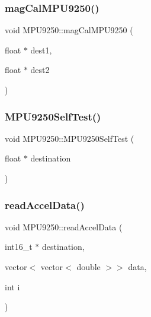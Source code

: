 \mbox{\label{classMPU9250_ad2ebbfb1d321b9c3312f4ae298214020}} 
\subsubsection{\texorpdfstring{mag\+Cal\+M\+P\+U9250()}{magCalMPU9250()}}
{\footnotesize\ttfamily void M\+P\+U9250\+::mag\+Cal\+M\+P\+U9250 (\begin{DoxyParamCaption}\item[{float $\ast$}]{dest1,  }\item[{float $\ast$}]{dest2 }\end{DoxyParamCaption})}

\mbox{\label{classMPU9250_ad3bbdef687191a70354ee2f900352993}} 
\subsubsection{\texorpdfstring{M\+P\+U9250\+Self\+Test()}{MPU9250SelfTest()}}
{\footnotesize\ttfamily void M\+P\+U9250\+::\+M\+P\+U9250\+Self\+Test (\begin{DoxyParamCaption}\item[{float $\ast$}]{destination }\end{DoxyParamCaption})}

\mbox{\label{classMPU9250_a66dc74fdb59049f61e1e86e4b71aabac}} 
\subsubsection{\texorpdfstring{read\+Accel\+Data()}{readAccelData()}}
{\footnotesize\ttfamily void M\+P\+U9250\+::read\+Accel\+Data (\begin{DoxyParamCaption}\item[{int16\+\_\+t $\ast$}]{destination,  }\item[{vector$<$ vector$<$ double $>$$>$}]{data,  }\item[{int}]{i }\end{DoxyParamCaption})}




